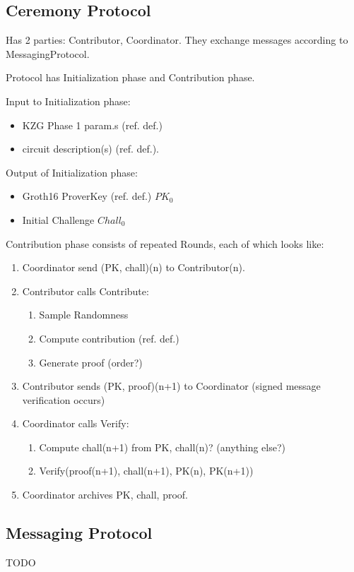 \subsection{Ceremony Protocol}
Has 2 parties: Contributor, Coordinator. They exchange messages according to MessagingProtocol.

Protocol has Initialization phase and Contribution phase. 

Input to Initialization phase: 
\begin{itemize}
    \item KZG Phase 1 param.s (ref. def.) 
    \item circuit description(s) (ref. def.).
\end{itemize}
Output of Initialization phase:
\begin{itemize}
    \item Groth16 ProverKey (ref. def.) $PK_0$
    \item Initial Challenge $Chall_0$
\end{itemize}

Contribution phase consists of repeated Rounds, each of which looks like:
\begin{enumerate}
\item Coordinator send (PK, chall)(n) to Contributor(n).
\item Contributor calls Contribute:
    \begin{enumerate}
        \item Sample Randomness
        \item Compute contribution (ref. def.)
        \item Generate proof (order?)
    \end{enumerate}
\item Contributor sends (PK, proof)(n+1) to Coordinator (signed message verification occurs)
\item Coordinator calls Verify:
    \begin{enumerate}
        \item Compute chall(n+1) from PK, chall(n)? (anything else?)
        \item Verify(proof(n+1), chall(n+1), PK(n), PK(n+1))
    \end{enumerate}
\item Coordinator archives PK, chall, proof.
\end{enumerate}

\subsection{Messaging Protocol}
TODO 

